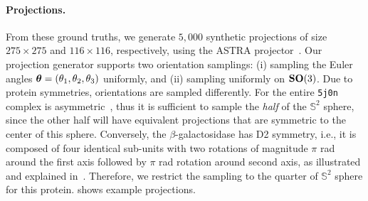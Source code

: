 \paragraph{Projections.}
From these ground truths, we generate $5,000$ synthetic projections of size $275\times 275$ and $116\times 116$, respectively, using the ASTRA projector~\cite{van2015astra}.
Our projection generator supports two orientation samplings: (i) sampling the Euler angles ${\boldsymbol{\theta}}=(\theta_1,\theta_2,\theta_3)$ uniformly, and (ii) sampling uniformly on $\mathrm{\mathbf{SO}}(3)$.
Due to protein symmetries, orientations are sampled differently.
For the entire \texttt{5j0n} complex is asymmetric~\cite{doi:10.1002/9780470514160.ch4}, thus it is sufficient to sample the \textit{half} of the $\mathbb{S}^2$ sphere, since the other half will have equivalent projections that are symmetric to the center of this sphere.
Conversely, the $\beta$-galactosidase has D2 symmetry, i.e., it is composed of four identical sub-units with two rotations of magnitude $\pi$ rad around the first axis followed by $\pi$ rad rotation around second axis, as illustrated and explained in~\cite{symmetry_in_protein,symmetry,scipion-em-github, rcsb-symmetry-view, EmpereurMot2019GeometricDO}.
Therefore, we restrict the sampling to the quarter of $\mathbb{S}^2$ sphere for this protein.
 shows example projections.

